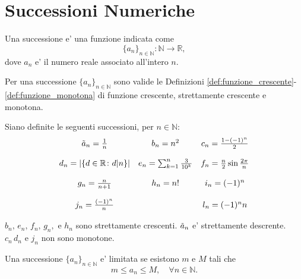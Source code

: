\section{Successioni Numeriche}
\begin{definition}[Successione]
    Una successione e' una funzione indicata come
    \begin{equation*}
        \{a_n\}_{n\in\mathbb N}\colon\mathbb N\rightarrow\mathbb R,
    \end{equation*}
    dove $a_n$ e' il numero reale associato all'intero $n$.
\end{definition}

\begin{remark}
    Per una successione $\{a_n\}_{n\in\mathbb N}$ sono valide le Definizioni \ref{def:funzione_crescente}-\ref{def:funzione_monotona} di funzione crescente, strettamente crescente e monotona.
\end{remark}

Siano definite le seguenti successioni, per $n\in\mathbb N$:
\begin{equation*}
    \begin{matrix}
        \Tilde{a}_n=\frac{1}{n} & b_n = n^2 & c_n = \frac{1-(-1)^n}{2}\\
        &&\\
        d_n=|\{d\in\mathbb R\colon d|n\}| & e_n=\sum_{k=1}^n\frac{3}{10^k} & f_n=\frac{n}{2}\sin\frac{2\pi}{n}\\
        &&\\
        g_n= \frac{n}{n+1} & h_n=n! & i_n= (-1)^n\\
        &&\\
        j_n=\frac{(-1)^n}{n} &  & l_n = (-1)^n n
    \end{matrix}
\end{equation*}

\begin{remark}
    $b_n,\, e_n,\, f_n,\, g_n,$ e $h_n$ sono strettamente crescenti. $\Tilde{a}_n$ e' strettamente descrente. $c_n\, d_n$ e $j_n$ non sono monotone.
\end{remark}

\begin{definition}
    Una successione $\{a_n\}_{n\in\mathbb N}$ e' limitata se esistono $m$ e $M$ tali che
    \begin{equation*}
        m\leq a_n\leq M,\quad \forall n\in\mathbb N.
    \end{equation*}
\end{definition}

